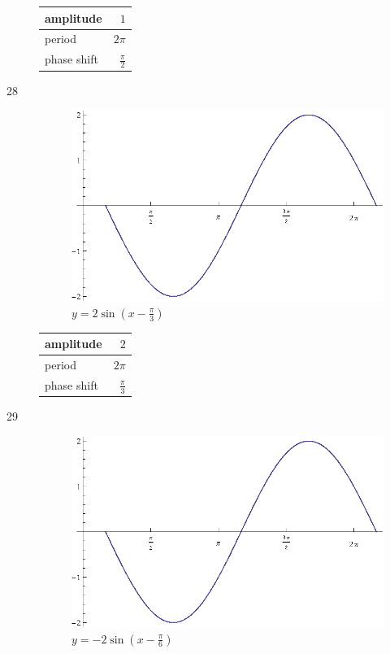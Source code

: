 \documentclass{exam}
\begin{document}
\begin{description}
        \begin{tabular}[H]{lr}
          \toprule
          amplitude & $1$ \\
          \midrule
          period & $2 \pi$ \\
          \midrule
          phase shift & $\frac{\pi}{2}$ \\
          \bottomrule
        \end{tabular}

      \item[28]
        \begin{figure}[H]
          \centering
          \includegraphics[scale=0.8]{exercise28.eps}
          \caption{$y = 2 \sin \left( x - \frac{\pi}{3} \right)$}
        \end{figure}

        \begin{tabular}[H]{lr}
          \toprule
          amplitude & $2$ \\
          \midrule
          period & $2 \pi$ \\
          \midrule
          phase shift & $\frac{\pi}{3}$ \\
          \bottomrule
        \end{tabular}

      \item[29]
        \begin{figure}[H]
          \centering
          \includegraphics[scale=0.8]{exercise29.eps}
          \caption{$y = - 2 \sin \left( x - \frac{\pi}{6} \right)$}
        \end{figure}


\end{description}
\end{document}
